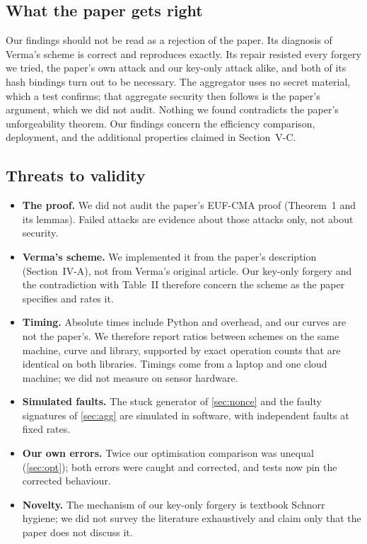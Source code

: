 \subsection{What the paper gets right}
Our findings should not be read as a rejection of the paper. Its diagnosis of Verma's scheme is correct
and reproduces exactly. Its repair resisted every forgery we tried, the paper's own attack and our key-only
attack alike, and both of its hash bindings turn out to be necessary. The aggregator uses no secret
material, which a test confirms; that aggregate security then follows is the paper's argument, which we
did not audit. Nothing we found contradicts the paper's unforgeability theorem. Our findings concern the
efficiency comparison, deployment, and the additional properties claimed in Section~V-C.

\subsection{Threats to validity}
\begin{itemize}
\item \textbf{The proof.} We did not audit the paper's EUF-CMA proof (Theorem~1 and its lemmas). Failed
      attacks are evidence about those attacks only, not about security.
\item \textbf{Verma's scheme.} We implemented it from the paper's description (Section~IV-A), not from
      Verma's original article. Our key-only forgery and the contradiction with Table~II therefore concern
      the scheme as the paper specifies and rates it.
\item \textbf{Timing.} Absolute times include Python and  overhead, and our curves are not
      the paper's. We therefore report ratios between schemes on the same machine, curve and library,
      supported by exact operation counts that are identical on both libraries. Timings come from a laptop
      and one cloud machine; we did not measure on sensor hardware.
\item \textbf{Simulated faults.} The stuck generator of \cref{sec:nonce} and the faulty signatures of
      \cref{sec:agg} are simulated in software, with independent faults at fixed rates.
\item \textbf{Our own errors.} Twice our optimisation comparison was unequal (\cref{sec:opt}); both errors
      were caught and corrected, and tests now pin the corrected behaviour.
\item \textbf{Novelty.} The mechanism of our key-only forgery is textbook Schnorr hygiene; we did not
      survey the literature exhaustively and claim only that the paper does not discuss it.
\end{itemize}
